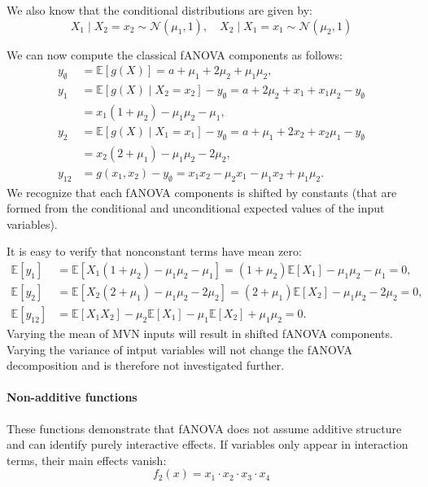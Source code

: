 We also know that the conditional distributions are given by:
\[
X_1 \mid X_2 = x_2 \sim \mathcal{N}(\mu_1, 1), \quad
X_2 \mid X_1 = x_1 \sim \mathcal{N}(\mu_2, 1)
\]

We can now compute the classical fANOVA components as follows:
\begin{align*}
    y_{\emptyset} &= \mathbb{E}[g(X)] = a + \mu_1 + 2\mu_2 + \mu_1 \mu_2, \\
    y_1 &= \mathbb{E}[g(X) \mid X_2 = x_2] - y_{\emptyset}= a + 2\mu_2 + x_1 + x_1 \mu_2 - y_{\emptyset} \\
    &= x_1 ( 1 + \mu_2) - \mu_1 \mu_2 - \mu_1, \\
    y_2 &= \mathbb{E}[g(X) \mid X_1 = x_1] - y_{\emptyset} = a + \mu_1 + 2x_2 + x_2 \mu_1 - y_{\emptyset} \\
    &= x_2 (2 + \mu_1) - \mu_1 \mu_2 - 2 \mu_2, \\
    y_{12} &= g(x_1, x_2) - y_{\emptyset} = x_1x_2 - \mu_2 x_1 - \mu_1 x_2 + \mu_1 \mu_2.      
\end{align*}
We recognize that each fANOVA components is shifted by constants (that are formed from the conditional and unconditional expected values of the input variables). 

It is easy to verify that nonconstant terms have mean zero:
\begin{align*}
    \mathbb{E}[y_1] &= \mathbb{E}[X_1 (1 + \mu_2) - \mu_1 \mu_2 - \mu_1] = (1 + \mu_2) \mathbb{E}[X_1] - \mu_1 \mu_2 - \mu_1 = 0, \\
    \mathbb{E}[y_2] &= \mathbb{E}[X_2 (2 + \mu_1) - \mu_1 \mu_2 - 2\mu_2] = (2 + \mu_1) \mathbb{E}[X_2] - \mu_1 \mu_2 - 2\mu_2 = 0, \\
    \mathbb{E}[y_{12}] &= \mathbb{E}[X_1X_2] - \mu_2 \mathbb{E}[X_1] - \mu_1 \mathbb{E}[X_2] + \mu_1 \mu_2 = 0.
\end{align*}
Varying the mean of MVN inputs will result in shifted fANOVA components. Varying the variance of intput variables will not change the fANOVA decomposition and is therefore not investigated further.

\paragraph{Non-additive functions}
These functions demonstrate that fANOVA does not assume additive structure and can identify purely interactive effects. If variables only appear in interaction terms, their main effects vanish:
\[
f_2(x) = x_1 \cdot x_2 \cdot x_3 \cdot x_4
\]


